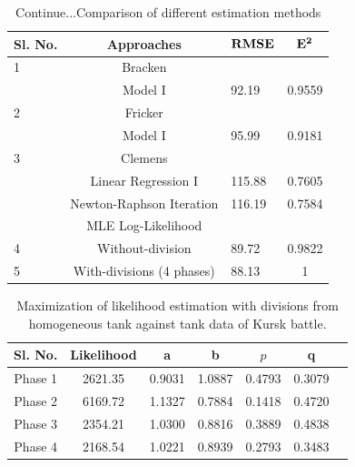 \documentclass[]{article}
\begin{document}
\begin{table}
\tiny
\caption{Continue...Comparison of different estimation methods}\label{table}

{\begin{tabular}{|p{.1cm}|c|p{.8cm}|c|}   \hline\hline
\bf{Sl. No.} & \bf{Approaches} &		$\bf{RMSE}$ &	${\bf{E^2}}$ \\
\hline
\hline
1&Bracken\autocite{Bracken:1995}& &  \\
\hline
&Model I&92.19&0.9559\\
\hline
2&Fricker\autocite{Fricker:1998}& &  \\
\hline
&Model I&95.99&0.9181\\
\hline
3&Clemens\autocite{Clemens:1997}& &  \\
\hline
&Linear Regression I&115.88&0.7605\\
\hline
&Newton-Raphson Iteration&116.19&0.7584\\
\hline
&MLE Log-Likelihood \autocite{Das:2007}& &  \\
\hline
4&Without-division&89.72&0.9822\\
\hline
5&With-divisions (4 phases)&88.13&1\\
\hline
\hline
\end{tabular}}
\end{table}


\begin{table}
\tiny
\caption{Maximization of likelihood estimation with divisions from homogeneous tank against tank data of Kursk battle. }
{\begin{tabular}{|c|c|c|c|c|c|c|}   \hline\hline
\bf{Sl. No.} & \bf{Likelihood} &	\bf{a}	& \bf{b} & \bf{$p$} & \bf{q} \\
\hline
\hline
Phase 1	&2621.35	&0.9031	&1.0887	&0.4793&	0.3079\\
\hline
Phase 2	&6169.72	&1.1327	&0.7884	&0.1418	&0.4720\\
\hline
Phase 3	&2354.21	&1.0300	&0.8816	&0.3889	&0.4838\\
\hline
Phase 4	&2168.54	&1.0221	&0.8939	&0.2793	&0.3483\\
\hline
\end{tabular}}
\end{table}
\end{document}
